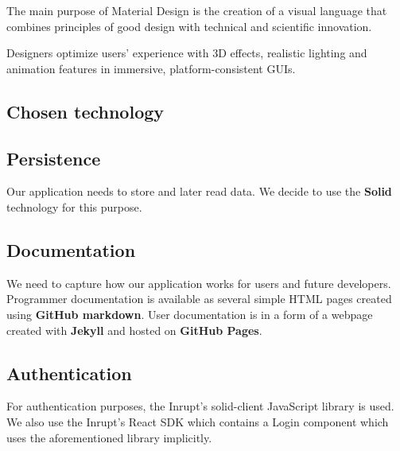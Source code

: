   The main purpose of Material Design is the creation of a visual language that combines principles of good design with technical and scientific innovation. 

  Designers optimize users' experience with 3D effects, realistic lighting and animation features in immersive, platform-consistent GUIs.

  \subsection*{Chosen technology}


\subsection{Persistence}
Our application needs to store and later read data.
We decide to use the \textbf{Solid} technology for this purpose. 

\subsection{Documentation}
We need to capture how our application works for users and future developers.
Programmer documentation is available as several simple HTML pages created using \textbf{GitHub markdown}.
User documentation is in a form of a webpage created with \textbf{Jekyll} and hosted on \textbf{GitHub Pages}.

\subsection{Authentication}
For authentication purposes, the Inrupt's solid-client JavaScript library is used.
We also use the Inrupt's React SDK which contains a Login component which uses the aforementioned library implicitly.




